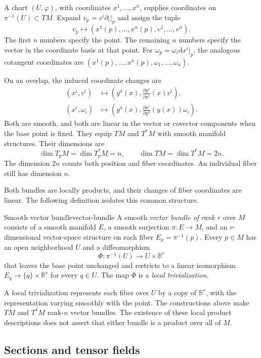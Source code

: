 \documentclass[11pt,a4paper]{article}
\numberwithin{equation}{section}
\newcommand{\R}{\mathbb R}
\newcommand{\dd}{\mathrm d}
\begin{document}
A chart \((U,\varphi)\), with coordinates \(x^1,\ldots,x^n\), supplies
coordinates on \(\pi^{-1}(U)\subset TM\). Expand
\(v_p=v^i\partial_i|_p\) and assign the tuple
\[
 v_p\longmapsto
 (x^1(p),\ldots,x^n(p),v^1,\ldots,v^n).
\]
The first \(n\) numbers specify the point. The remaining \(n\) numbers
specify the vector in the coordinate basis at that point. For
\(\omega_p=\omega_i\dd x^i|_p\), the analogous cotangent coordinates
are \((x^1(p),\ldots,x^n(p),\omega_1,\ldots,\omega_n)\).

On an overlap, the induced coordinate changes are
\[
 \begin{aligned}
 (x^i,v^i)&\longmapsto
 \left(y^a(x),\frac{\partial y^a}{\partial x^i}(x)v^i\right),\\
 (x^i,\omega_i)&\longmapsto
 \left(y^a(x),\frac{\partial x^i}{\partial y^a}(y(x))\omega_i\right).
 \end{aligned}
\]
Both are smooth, and both are linear in the vector or covector components
when the base point is fixed. They equip \(TM\) and \(T^*M\) with smooth
manifold structures. Their dimensions are
\[
 \dim T_pM=\dim T_p^*M=n,
 \qquad \dim TM=\dim T^*M=2n.
\]
The dimension \(2n\) counts both position and fiber coordinates. An
individual fiber still has dimension \(n\).

Both bundles are locally products, and their changes of fiber coordinates
are linear. The following definition isolates this common structure.

\begin{definition}{Smooth vector bundle}{vector-bundle}
A smooth \emph{vector bundle of rank \(r\)} over \(M\) consists of a
smooth manifold \(E\), a smooth surjection \(\pi:E\to M\), and an
\(r\)-dimensional vector-space structure on each fiber
\(E_p=\pi^{-1}(p)\). Every \(p\in M\) has an open neighborhood \(U\)
and a diffeomorphism
\[
 \Phi:\pi^{-1}(U)\longrightarrow U\times\R^r
\]
that leaves the base point unchanged and restricts to a linear
isomorphism \(E_q\to\{q\}\times\R^r\) for every \(q\in U\).
The map \(\Phi\) is a \emph{local trivialization}.
\end{definition}

A local trivialization represents each fiber over \(U\) by a copy of
\(\R^r\), with the representation varying smoothly with the point.
The constructions above make \(TM\) and \(T^*M\) rank-\(n\) vector
bundles. The existence of these local product descriptions does not
assert that either bundle is a product over all of \(M\).

\subsection{Sections and tensor fields}
\end{document}
